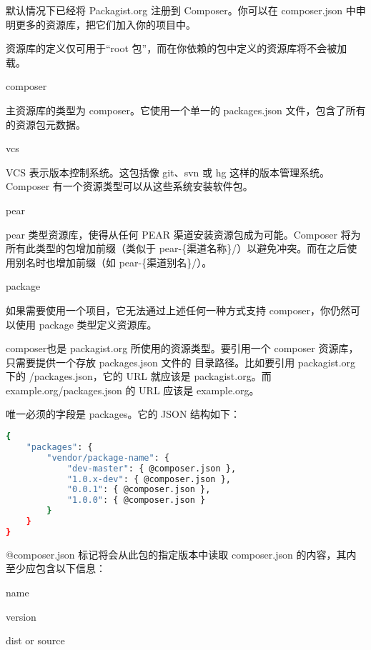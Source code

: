 默认情况下已经将 Packagist.org 注册到 Composer。你可以在 composer.json 中申明更多的资源库，把它们加入你的项目中。

资源库的定义仅可用于“root 包”，而在你依赖的包中定义的资源库将不会被加载。

\begin{compactitem}
\item composer

主资源库的类型为 composer。它使用一个单一的 packages.json 文件，包含了所有的资源包元数据。

\item vcs

VCS 表示版本控制系统。这包括像 git、svn 或 hg 这样的版本管理系统。Composer 有一个资源类型可以从这些系统安装软件包。

\item pear

pear 类型资源库，使得从任何 PEAR 渠道安装资源包成为可能。Composer 将为所有此类型的包增加前缀（类似于 pear-\{渠道名称\}/）以避免冲突。而在之后使用别名时也增加前缀（如 pear-\{渠道别名\}/）。

\item package

如果需要使用一个项目，它无法通过上述任何一种方式支持 composer，你仍然可以使用 package 类型定义资源库。

\end{compactitem}

composer也是 packagist.org 所使用的资源类型。要引用一个 composer 资源库，只需要提供一个存放 packages.json 文件的 目录路径。比如要引用 packagist.org 下的 /packages.json，它的 URL 就应该是 packagist.org。而 example.org/packages.json 的 URL 应该是 example.org。

唯一必须的字段是 packages。它的 JSON 结构如下：


\begin{lstlisting}[language=bash]
{
    "packages": {
        "vendor/package-name": {
            "dev-master": { @composer.json },
            "1.0.x-dev": { @composer.json },
            "0.0.1": { @composer.json },
            "1.0.0": { @composer.json }
        }
    }
}
\end{lstlisting}

@composer.json 标记将会从此包的指定版本中读取 composer.json 的内容，其内至少应包含以下信息：

\begin{compactitem}
\item name
\item version
\item dist or source
\end{compactitem}

